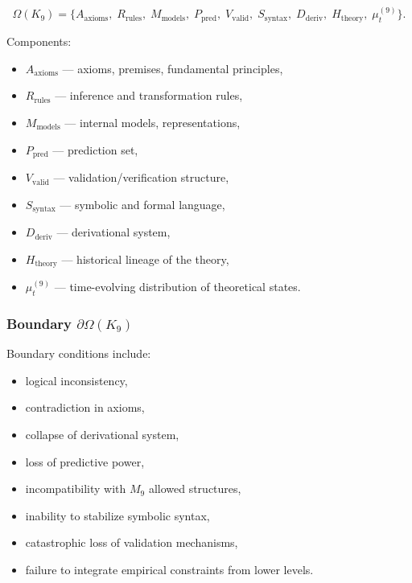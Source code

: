 \[
\Omega(K_9)=
\{
A_{\mathrm{axioms}},\;
R_{\mathrm{rules}},\;
M_{\mathrm{models}},\;
P_{\mathrm{pred}},\;
V_{\mathrm{valid}},\;
S_{\mathrm{syntax}},\;
D_{\mathrm{deriv}},\;
H_{\mathrm{theory}},\;
\mu^{(9)}_t
\}.
\]

Components:
\begin{itemize}
    \item $A_{\mathrm{axioms}}$ — axioms, premises, fundamental principles,
    \item $R_{\mathrm{rules}}$ — inference and transformation rules,
    \item $M_{\mathrm{models}}$ — internal models, representations,
    \item $P_{\mathrm{pred}}$ — prediction set,
    \item $V_{\mathrm{valid}}$ — validation/verification structure,
    \item $S_{\mathrm{syntax}}$ — symbolic and formal language,
    \item $D_{\mathrm{deriv}}$ — derivational system,
    \item $H_{\mathrm{theory}}$ — historical lineage of the theory,
    \item $\mu^{(9)}_t$ — time-evolving distribution of theoretical states.
\end{itemize}

\subsubsection{Boundary \texorpdfstring{$\partial\Omega(K_9)$}{\partial\Omega(K_9)}}

Boundary conditions include:
\begin{itemize}
    \item logical inconsistency,
    \item contradiction in axioms,
    \item collapse of derivational system,
    \item loss of predictive power,
    \item incompatibility with $M_9$ allowed structures,
    \item inability to stabilize symbolic syntax,
    \item catastrophic loss of validation mechanisms,
    \item failure to integrate empirical constraints from lower levels.
\end{itemize}

